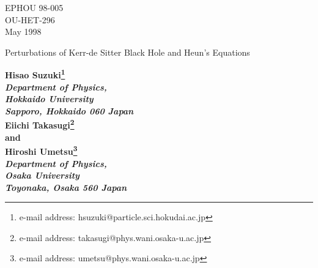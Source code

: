\newcommand{\la}{\lambda}


\setlength{\baselineskip}{7mm}

\begin{titlepage}
\setcounter{page}{0}
\begin{flushright}
EPHOU 98-005\\
OU-HET-296\\
May 1998
\end{flushright}
\begin{center}
{\Large Perturbations of Kerr-de Sitter Black Hole and Heun's Equations}

{\bf {\sc
Hisao Suzuki\footnote{e-mail address: hsuzuki@particle.sci.hokudai.ac.jp}}
\\
{\em Department of Physics, \\
Hokkaido
University \\  Sapporo, Hokkaido 060 Japan} \\
{\sc Eiichi Takasugi\footnote{
e-mail address: takasugi@phys.wani.osaka-u.ac.jp}}
\\and \\
{\sc Hiroshi Umetsu\footnote{
e-mail address: umetsu@phys.wani.osaka-u.ac.jp}}\\
{\em Department of Physics,\\
Osaka University\\
Toyonaka, Osaka 560 Japan}}\\
\end{center}

\begin{abstract}
It is well known that the perturbation equations of massless fields for 
the Kerr-de Sitter geometry can be written in the form of 
separable equations. The equations  have five definite singularities so that 
the analysis has been expected to be difficult. We show that these equations 
can be transformed to  Heun's equations, for which we are able to use 
known technique for the analysis of the solutions.  
We reproduce results known previously for the Kerr geometry and 
de Sitter geometry in the confluent limits of the Heun's functions. 
Our analysis applies can be extended to Kerr-Newman-de Sitter geometry for 
massless fields with spin 0 and $\frac 12$.  
\end{abstract}
\end{titlepage}

